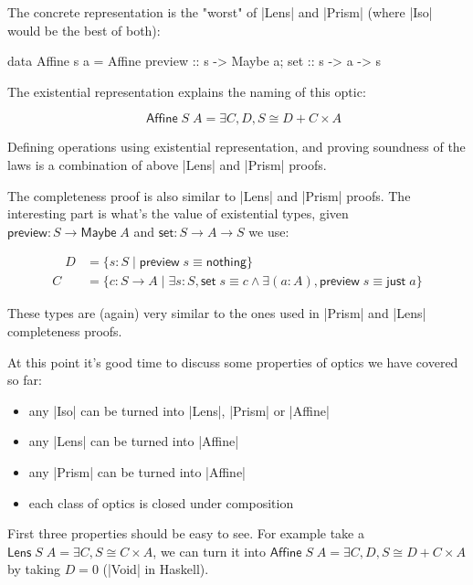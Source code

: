 \documentclass{article}
\begin{document}
The concrete representation is the "worst" of |Lens| and |Prism|
(where |Iso| would be the best of both):

\begin{code}
data Affine s a = Affine { preview :: s -> Maybe a; set :: s -> a -> s }
\end{code}

The existential representation explains the naming of this optic:

\begin{equation}
\quad \mathsf{Affine}\;S\;A = \exists C, D, S \cong D + C \times A
\end{equation}

Defining operations using existential representation, and proving
soundness of the laws is a combination of above |Lens| and |Prism|
proofs.

The completeness proof is also similar to |Lens| and |Prism| proofs.
The interesting part is what's the value of existential types, given
$\mathsf{preview} : S \to \mathsf{Maybe}\;A$ and
$\mathsf{set} : S \to A \to S$ we use:

\begin{equation}
\begin{aligned}
\quad D &= \{ s : S \mid \mathsf{preview}\;s \equiv \mathsf{nothing} \} \\
      C &= \{ c : S \to A \mid \exists s : S, \mathsf{set}\;s \equiv c \land \exists (a : A), \mathsf{preview}\;s \equiv \mathsf{just}\;a \}
\end{aligned}
\end{equation}

These types are (again) very similar to the ones used in |Prism| and |Lens|
completeness proofs.

At this point it's good time to discuss some properties of optics we have covered so far:
\begin{itemize}
\item any |Iso| can be turned into |Lens|, |Prism| or |Affine|
\item any |Lens| can be turned into |Affine|
\item any |Prism| can be turned into |Affine|
\item each class of optics is closed under composition
\end{itemize}

First three properties should be easy to see.
For example take a $\mathsf{Lens}\;S\;A = \exists C, S\cong C \times A$,
we can turn it into $\mathsf{Affine}\;S\;A = \exists C, D, S\cong D + C \times A$
by taking $D = 0$ (|Void| in Haskell).
\end{document}
